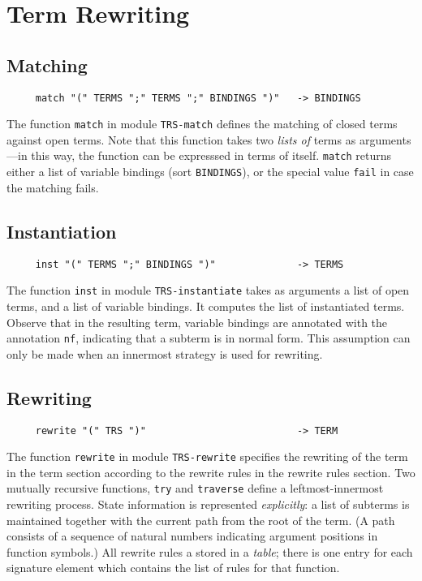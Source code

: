 \section{Term Rewriting}

\subsection{Matching}

\begin{verbatim}
     match "(" TERMS ";" TERMS ";" BINDINGS ")"   -> BINDINGS
\end{verbatim}
The function {\tt match} in module {\tt TRS-match} defines the matching of
closed terms against open terms.
Note that this function takes two {\it lists of} terms as arguments---in
this way, the function can be expresssed in terms of itself. {\tt match}
returns either a list of variable bindings (sort {\tt BINDINGS}), or the
special value {\tt fail} in case the matching fails.

\subsection{Instantiation}

\begin{verbatim}
     inst "(" TERMS ";" BINDINGS ")"              -> TERMS
\end{verbatim}
The function {\tt inst} in module {\tt TRS-instantiate} takes as arguments a
list of open terms, and a list of variable bindings.
It computes the list of instantiated terms. Observe that in the resulting
term, variable bindings are annotated with the annotation {\tt nf}, indicating
that a subterm is in normal form. This assumption can only be made when an
innermost strategy is used for rewriting.

\subsection{Rewriting}

\begin{verbatim}
     rewrite "(" TRS ")"                          -> TERM
\end{verbatim}
The function {\tt rewrite} in module {\tt TRS-rewrite} specifies the
rewriting of the term in the term section according to the rewrite rules
in the rewrite rules section. Two mutually recursive functions, {\tt try}
and {\tt traverse} define a leftmost-innermost rewriting process. State
information is represented {\it explicitly}: a list of subterms is
maintained together with the current path from the root of the term. (A
path consists of a sequence of natural numbers indicating argument positions
in function symbols.) All rewrite rules a stored in a {\it table}; there is
one entry for each signature element which contains the list of rules for that
function.

